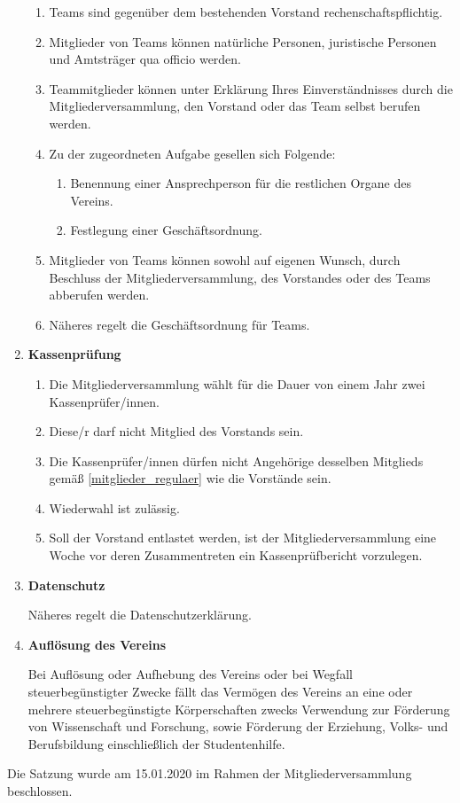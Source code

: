 \documentclass[german]{article}
\newcommand{\paragr}[1]{\item \textsf{\textbf{#1}}}
\begin{document}
\begin{enumerate}
\begin{enumerate}
\item Teams sind gegenüber dem bestehenden Vorstand rechenschaftspflichtig.

\item Mitglieder von Teams können natürliche Personen, juristische Personen und Amtsträger qua officio werden.

\item Teammitglieder können unter Erklärung Ihres Einverständnisses durch die Mitgliederversammlung, den Vorstand oder das Team selbst berufen werden.

\item Zu der zugeordneten Aufgabe gesellen sich Folgende:
\begin{enumerate}
\item Benennung einer Ansprechperson für die restlichen Organe des Vereins.
\item Festlegung einer Geschäftsordnung.
\end{enumerate}

\item Mitglieder von Teams können sowohl auf eigenen Wunsch, durch Beschluss der Mitgliederversammlung, des Vorstandes oder des Teams abberufen werden.

\item Näheres regelt die Geschäftsordnung für Teams.

\end{enumerate}


\paragr{Kassenprüfung}
\begin{enumerate}

\item Die Mitgliederversammlung wählt für die Dauer von einem Jahr zwei Kassenprüfer/innen.

\item Diese/r darf nicht Mitglied des Vorstands sein.

\item Die Kassenprüfer/innen dürfen nicht Angehörige desselben Mitglieds gemäß \ref{mitglieder_regulaer} wie die Vorstände sein.

\item Wiederwahl ist zulässig.

\item Soll der Vorstand entlastet werden, ist der Mitgliederversammlung eine Woche vor deren Zusammentreten ein Kassenprüfbericht vorzulegen.

\end{enumerate}


\paragr{Datenschutz}

Näheres regelt die Datenschutzerklärung.


\paragr{Auflösung des Vereins}

Bei Auflösung oder Aufhebung des Vereins oder bei Wegfall steuerbegünstigter Zwecke fällt das Vermögen des Vereins an eine oder mehrere steuerbegünstigte Körperschaften zwecks Verwendung zur Förderung von Wissenschaft und Forschung, sowie Förderung der Erziehung, Volks- und Berufsbildung einschließlich der Studentenhilfe.


\end{enumerate}
\vspace{2cm}
Die Satzung wurde am 15.01.2020 im Rahmen der Mitgliederversammlung beschlossen.
	
\end{document}
